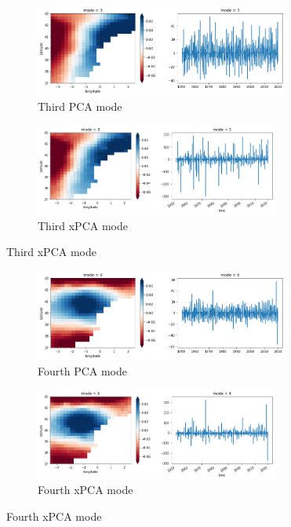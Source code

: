 \documentclass[11pt, oneside]{book}
\theoremstyle{plain}
\theoremstyle{remark}
\begin{document}
\begin{figure}[h!]
\centering
\begin{subfigure}{.5\textwidth}
    \centering
    \includegraphics[width=.95\linewidth, height=3cm]{vlc-mode3}
    \caption{Third PCA mode}
\end{subfigure}%
\begin{subfigure}{.5\textwidth}
    \centering
    \includegraphics[width=.95\linewidth, height=3cm]{vlc-tran-mode3}
    \caption{Third xPCA mode}
\end{subfigure}
\end{figure}
\begin{figure}[h!]
\centering
\begin{subfigure}{.5\textwidth}
    \centering
    \includegraphics[width=.95\linewidth, height=3cm]{vlc-mode4}
    \caption{Fourth PCA mode}
\end{subfigure}%
\begin{subfigure}{.5\textwidth}
    \centering
    \includegraphics[width=.95\linewidth, height=3cm]{vlc-tran-mode4}
    \caption{Fourth xPCA mode}
\end{subfigure}
\end{figure}
\end{document}
